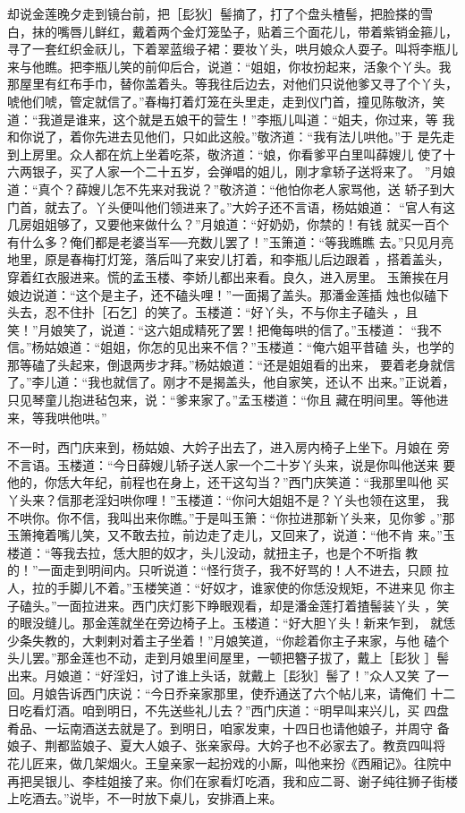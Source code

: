 却说金莲晚夕走到镜台前，把［髟狄］髻摘了，打了个盘头楂髻，把脸搽的雪
白，抹的嘴唇儿鲜红，戴着两个金灯笼坠子，贴着三个面花儿，带着紫销金箍儿，
寻了一套红织金祆儿，下着翠蓝缎子裙：要妆丫头，哄月娘众人耍子。叫将李瓶儿
来与他瞧。把李瓶儿笑的前仰后合，说道：“姐姐，你妆扮起来，活象个丫头。我
那屋里有红布手巾，替你盖着头。等我往后边去，对他们只说他爹又寻了个丫头，
唬他们唬，管定就信了。”春梅打着灯笼在头里走，走到仪门首，撞见陈敬济，笑
道：“我道是谁来，这个就是五娘干的营生！”李瓶儿叫道：“姐夫，你过来，等
我和你说了，着你先进去见他们，只如此这般。”敬济道：“我有法儿哄他。”于
是先走到上房里。众人都在炕上坐着吃茶，敬济道：“娘，你看爹平白里叫薛嫂儿
使了十六两银子，买了人家一个二十五岁，会弹唱的姐儿，刚才拿轿子送将来了。
”月娘道：“真个？薛嫂儿怎不先来对我说？”敬济道：“他怕你老人家骂他，送
轿子到大门首，就去了。丫头便叫他们领进来了。”大妗子还不言语，杨姑娘道：
“官人有这几房姐姐够了，又要他来做什么？”月娘道：“好奶奶，你禁的！有钱
就买一百个有什么多？俺们都是老婆当军──充数儿罢了！”玉箫道：“等我瞧瞧
去。”只见月亮地里，原是春梅打灯笼，落后叫了来安儿打着，和李瓶儿后边跟着
，搭着盖头，穿着红衣服进来。慌的孟玉楼、李娇儿都出来看。良久，进入房里。
玉箫挨在月娘边说道：“这个是主子，还不磕头哩！”一面揭了盖头。那潘金莲插
烛也似磕下头去，忍不住扑［石乞］的笑了。玉楼道：“好丫头，不与你主子磕头
，且笑！”月娘笑了，说道：“这六姐成精死了罢！把俺每哄的信了。”玉楼道：
“我不信。”杨姑娘道：“姐姐，你怎的见出来不信？”玉楼道：“俺六姐平昔磕
头，也学的那等磕了头起来，倒退两步才拜。”杨姑娘道：“还是姐姐看的出来，
要着老身就信了。”李儿道：“我也就信了。刚才不是揭盖头，他自家笑，还认不
出来。”正说着，只见琴童儿抱进毡包来，说：“爹来家了。”孟玉楼道：“你且
藏在明间里。等他进来，等我哄他哄。”

不一时，西门庆来到，杨姑娘、大妗子出去了，进入房内椅子上坐下。月娘在
旁不言语。玉楼道：“今日薛嫂儿轿子送人家一个二十岁丫头来，说是你叫他送来
要他的，你恁大年纪，前程也在身上，还干这勾当？”西门庆笑道：“我那里叫他
买丫头来？信那老淫妇哄你哩！”玉楼道：“你问大姐姐不是？丫头也领在这里，
我不哄你。你不信，我叫出来你瞧。”于是叫玉箫：“你拉进那新丫头来，见你爹
。”那玉箫掩着嘴儿笑，又不敢去拉，前边走了走儿，又回来了，说道：“他不肯
来。”玉楼道：“等我去拉，恁大胆的奴才，头儿没动，就扭主子，也是个不听指
教的！”一面走到明间内。只听说道：“怪行货子，我不好骂的！人不进去，只顾
拉人，拉的手脚儿不着。”玉楼笑道：“好奴才，谁家使的你恁没规矩，不进来见
你主子磕头。”一面拉进来。西门庆灯影下睁眼观看，却是潘金莲打着揸髻装丫头
，笑的眼没缝儿。那金莲就坐在旁边椅子上。玉楼道：“好大胆丫头！新来乍到，
就恁少条失教的，大剌剌对着主子坐着！”月娘笑道，“你趁着你主子来家，与他
磕个头儿罢。”那金莲也不动，走到月娘里间屋里，一顿把簪子拔了，戴上［髟狄
］髻出来。月娘道：“好淫妇，讨了谁上头话，就戴上［髟狄］髻了！”众人又笑
了一回。月娘告诉西门庆说：“今日乔亲家那里，使乔通送了六个帖儿来，请俺们
十二日吃看灯酒。咱到明日，不先送些礼儿去？”西门庆道：“明早叫来兴儿，买
四盘肴品、一坛南酒送去就是了。到明日，咱家发柬，十四日也请他娘子，并周守
备娘子、荆都监娘子、夏大人娘子、张亲家母。大妗子也不必家去了。教贲四叫将
花儿匠来，做几架烟火。王皇亲家一起扮戏的小厮，叫他来扮《西厢记》。往院中
再把吴银儿、李桂姐接了来。你们在家看灯吃酒，我和应二哥、谢子纯往狮子街楼
上吃酒去。”说毕，不一时放下桌儿，安排酒上来。

